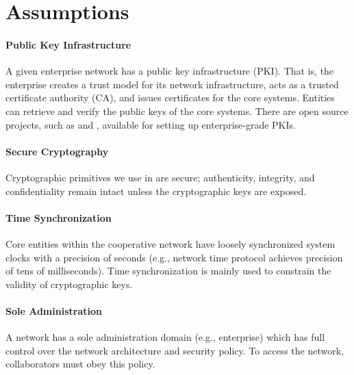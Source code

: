 

\section{Assumptions}
\label{sec:assumptions}

\paragraph{Public Key Infrastructure}
A given enterprise network has a public key infrastructure (PKI). That is, the enterprise
creates a trust model for its network infrastructure, acts as a trusted certificate authority
(CA), and issues certificates for the core systems. Entities can retrieve and verify the
public keys of the core systems. There are open source projects, such as  and , available for setting up enterprise-grade PKIs.

\paragraph{Secure Cryptography}
Cryptographic primitives we use in \name are secure; authenticity, integrity, and
confidentiality remain intact unless the cryptographic keys are exposed.

\paragraph{Time Synchronization}
Core entities within the cooperative network have loosely synchronized system clocks with a
precision of seconds (e.g., network time protocol achieves precision of tens of milliseconds).
Time synchronization is mainly used to constrain the validity of cryptographic keys.

\paragraph{Sole Administration}
A network has a sole administration domain (e.g., enterprise) which has full control over
the network architecture and security policy. To access the network, collaborators
must obey this policy.

